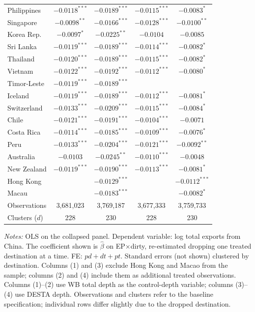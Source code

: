 \documentclass{article}
\begin{document}
\begin{table}[htbp]
\begin{threeparttable}
\begin{tabular}{lcccc}
Philippines    & $-0.0118^{***}$ & $-0.0189^{***}$ & $-0.0115^{***}$ & $-0.0083^{*}$  \\
Singapore      & $-0.0098^{**}$  & $-0.0166^{***}$ & $-0.0128^{***}$ & $-0.0100^{**}$ \\
Korea Rep.     & $-0.0097^{*}$   & $-0.0225^{**}$  & $-0.0104$       & $-0.0085$      \\
Sri Lanka      & $-0.0119^{***}$ & $-0.0189^{***}$ & $-0.0114^{***}$ & $-0.0082^{*}$  \\
Thailand       & $-0.0120^{***}$ & $-0.0189^{***}$ & $-0.0115^{***}$ & $-0.0082^{*}$  \\
Vietnam        & $-0.0122^{***}$ & $-0.0192^{***}$ & $-0.0112^{***}$ & $-0.0080^{*}$  \\
Timor-Leste    & $-0.0119^{***}$ & $-0.0189^{***}$ &                 &                \\
Iceland        & $-0.0119^{***}$ & $-0.0189^{***}$ & $-0.0112^{***}$ & $-0.0081^{*}$  \\
Switzerland    & $-0.0133^{***}$ & $-0.0209^{***}$ & $-0.0115^{***}$ & $-0.0084^{*}$  \\
Chile          & $-0.0121^{***}$ & $-0.0191^{***}$ & $-0.0104^{***}$ & $-0.0071$      \\
Costa Rica     & $-0.0114^{***}$ & $-0.0185^{***}$ & $-0.0109^{***}$ & $-0.0076^{*}$  \\
Peru           & $-0.0133^{***}$ & $-0.0204^{***}$ & $-0.0121^{***}$ & $-0.0092^{**}$ \\
Australia      & $-0.0103$       & $-0.0245^{**}$  & $-0.0110^{***}$ & $-0.0048$      \\
New Zealand    & $-0.0119^{***}$ & $-0.0190^{***}$ & $-0.0113^{***}$ & $-0.0081^{*}$  \\
\midrule
Hong Kong      &                 & $-0.0129^{***}$ &                 & $-0.0112^{***}$ \\
Macau          &                 & $-0.0183^{***}$ &                 & $-0.0082^{*}$  \\
\midrule
Observations   & 3,681,023       & 3,769,187       & 3,677,333       & 3,759,733      \\
Clusters ($d$) & 228             & 230             & 228             & 230            \\
\bottomrule
\end{tabular}
\begin{tablenotes}[flushleft]\footnotesize
\item \emph{Notes:} OLS on the collapsed panel. Dependent variable: log total exports from China. The coefficient shown is $\widehat{\beta}$ on EP$\times$dirty, re-estimated dropping one treated destination at a time. FE: $pd + dt + pt$. Standard errors (not shown) clustered by destination. Columns (1) and (3) exclude Hong Kong and Macao from the sample; columns (2) and (4) include them as additional treated observations. Columns (1)--(2) use WB total depth as the control-depth variable; columns (3)--(4) use DESTA depth. Observations and clusters refer to the baseline specification; individual rows differ slightly due to the dropped destination.

\end{tablenotes}
\end{threeparttable}
\end{table}
\end{document}
